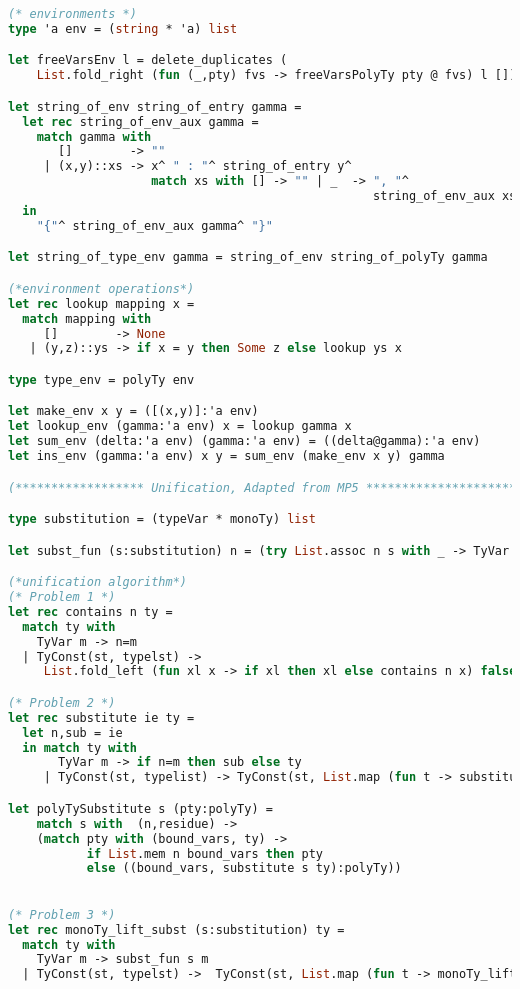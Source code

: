 \begin{lstlisting}[language=Caml, caption=definitions.ml]
(* environments *)
type 'a env = (string * 'a) list

let freeVarsEnv l = delete_duplicates (
    List.fold_right (fun (_,pty) fvs -> freeVarsPolyTy pty @ fvs) l [])

let string_of_env string_of_entry gamma = 
  let rec string_of_env_aux gamma =
    match gamma with
       []        -> ""
     | (x,y)::xs -> x^ " : "^ string_of_entry y^
                    match xs with [] -> "" | _  -> ", "^
                                                   string_of_env_aux xs
  in
    "{"^ string_of_env_aux gamma^ "}"

let string_of_type_env gamma = string_of_env string_of_polyTy gamma

(*environment operations*)
let rec lookup mapping x =
  match mapping with
     []        -> None
   | (y,z)::ys -> if x = y then Some z else lookup ys x

type type_env = polyTy env

let make_env x y = ([(x,y)]:'a env)
let lookup_env (gamma:'a env) x = lookup gamma x
let sum_env (delta:'a env) (gamma:'a env) = ((delta@gamma):'a env)
let ins_env (gamma:'a env) x y = sum_env (make_env x y) gamma

(****************** Unification, Adapted from MP5 ***********************)

type substitution = (typeVar * monoTy) list

let subst_fun (s:substitution) n = (try List.assoc n s with _ -> TyVar n)

(*unification algorithm*)
(* Problem 1 *)
let rec contains n ty =
  match ty with
    TyVar m -> n=m
  | TyConst(st, typelst) ->
     List.fold_left (fun xl x -> if xl then xl else contains n x) false typelst;;

(* Problem 2 *)
let rec substitute ie ty = 
  let n,sub = ie 
  in match ty with
       TyVar m -> if n=m then sub else ty
     | TyConst(st, typelist) -> TyConst(st, List.map (fun t -> substitute ie t) typelist);;

let polyTySubstitute s (pty:polyTy) =
    match s with  (n,residue) ->
    (match pty with (bound_vars, ty) -> 
           if List.mem n bound_vars then pty
           else ((bound_vars, substitute s ty):polyTy))
    

(* Problem 3 *)
let rec monoTy_lift_subst (s:substitution) ty =
  match ty with
    TyVar m -> subst_fun s m
  | TyConst(st, typelst) ->  TyConst(st, List.map (fun t -> monoTy_lift_subst s t) typelst);;


\end{lstlisting}
